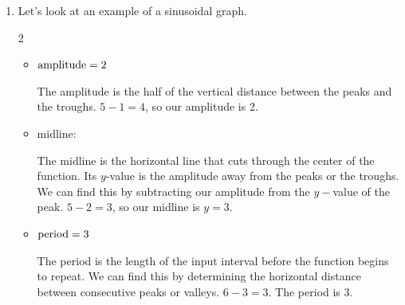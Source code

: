 \documentclass[main]{subfiles}
\begin{document}
\begin{enumerate}[resume]
\item

\begin{problem}
    Let's look at an example of a sinusoidal graph.
\end{problem}
  
  \setlength{\columnsep}{-10pt}
  \begin{multicols}{2}
  
  \begin{center}
    \end{center}
    
    \columnbreak

    \null
    \begin{itemize}[itemsep=36pt]
    \item $\text{amplitude} = 2$
    
    \begin{solution}
        The amplitude is the half of the vertical distance between the peaks and the troughs. $5-1 = 4$, so our amplitude is 2.
    \end{solution}
    \item midline: 
    
    \begin{solution}
        The midline is the horizontal line that cuts through the center of the function. Its $y$-value is the amplitude away from the peaks or the troughs. We can find this by subtracting our amplitude from the $y-$value of the peak. $5-2=3$, so our midline is $y=3$.
    \end{solution}
    \item $\text{period}= 3$
    
    \begin{solution}
        The period is the length of the input interval before the function begins to repeat. We can find this by determining the horizontal distance between consecutive peaks or valleys. $6-3=3$. The period is 3.
    \end{solution}
    \end{itemize}
    

\end{multicols}
\end{enumerate}
\end{document}
